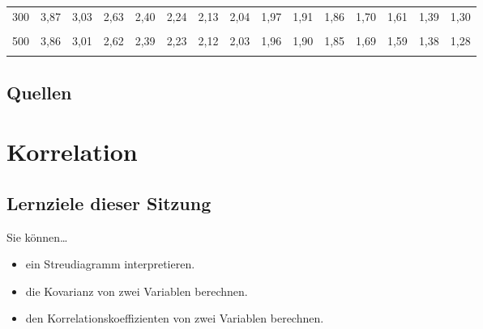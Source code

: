 \documentclass[
  ngerman,
]{article}
\providecommand{\tightlist}{%
  \setlength{\itemsep}{0pt}\setlength{\parskip}{0pt}}
\begin{document}
\begin{table}[!h]
{\begin{tabular}{>{}r|rrrrrrrrrrrrrr}
300 & 3,87 & 3,03 & 2,63 & 2,40 & 2,24 & 2,13 & 2,04 & 1,97 & 1,91 & 1,86 & 1,70 & 1,61 & 1,39 & 1,30\\
\cellcolor{gray!6}{400} & \cellcolor{gray!6}{3,86} & \cellcolor{gray!6}{3,02} & \cellcolor{gray!6}{2,63} & \cellcolor{gray!6}{2,39} & \cellcolor{gray!6}{2,24} & \cellcolor{gray!6}{2,12} & \cellcolor{gray!6}{2,03} & \cellcolor{gray!6}{1,96} & \cellcolor{gray!6}{1,90} & \cellcolor{gray!6}{1,85} & \cellcolor{gray!6}{1,69} & \cellcolor{gray!6}{1,60} & \cellcolor{gray!6}{1,38} & \cellcolor{gray!6}{1,28}\\
500 & 3,86 & 3,01 & 2,62 & 2,39 & 2,23 & 2,12 & 2,03 & 1,96 & 1,90 & 1,85 & 1,69 & 1,59 & 1,38 & 1,28\\
\addlinespace
\cellcolor{gray!6}{1000} & \cellcolor{gray!6}{3,85} & \cellcolor{gray!6}{3,00} & \cellcolor{gray!6}{2,61} & \cellcolor{gray!6}{2,38} & \cellcolor{gray!6}{2,22} & \cellcolor{gray!6}{2,11} & \cellcolor{gray!6}{2,02} & \cellcolor{gray!6}{1,95} & \cellcolor{gray!6}{1,89} & \cellcolor{gray!6}{1,84} & \cellcolor{gray!6}{1,68} & \cellcolor{gray!6}{1,58} & \cellcolor{gray!6}{1,36} & \cellcolor{gray!6}{1,26}\\
\bottomrule
\end{tabular}}
\end{table}

\pagebreak

\hypertarget{quellen-5}{%
\subsection{Quellen}\label{quellen-5}}

\hypertarget{korrelation}{%
\section{Korrelation}\label{korrelation}}

\hypertarget{lernziele-dieser-sitzung-6}{%
\subsection{Lernziele dieser Sitzung}\label{lernziele-dieser-sitzung-6}}

Sie können\ldots{}

\begin{itemize}
\tightlist
\item
  ein Streudiagramm interpretieren.
\item
  die Kovarianz von zwei Variablen berechnen.
\item
  den Korrelationskoeffizienten von zwei Variablen berechnen.
\end{itemize}
\end{document}
